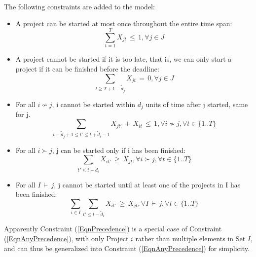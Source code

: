 \documentclass[final,3p,times]{elsarticle}
\begin{document}
	The following constraints are added to the model:
	
	\begin{itemize}
	
		\item A project can be started at most once throughout the entire time span:
		\begin{equation}
			\label{EqnConstraintStartOnlyOnce}
			\sum\limits_{t=1}^{T} X_{jt}\,\leq\,1,\forall j \in J
		\end{equation}
		
		\item A project cannot be started if it is too late, that is, we can only start a project if it can be finished before the deadline:
		\begin{equation}
			\sum\limits_{t\geq T+1-\tilde{d}_j} X_{jt}\,=\,0, \forall j \in J
		\end{equation}
		
		\item For all $i \nsim j$, i cannot be started within $d_j$ units of time after j started, same for j.
		\begin{equation}
			\sum\limits_{t-\tilde{d}_j+1\leq t'\leq t+\tilde{d}_i-1} X_{jt'}\,+\,X_{it}\,\leq\,1,\forall i \nsim j, \forall t \in \{1 .. T\}
		\end{equation}
		
		\item For all $i \succ j$, j can be started only if i has been finished:
		\begin{equation}
			\label{EqnPrecedence}
			\sum\limits_{t'\leq t-\tilde{d}_i} X_{it'} \,\geq\, X_{jt},\forall i\succ j, \forall t \in \{1 .. T\} 
		\end{equation}
		
		\item For all $I\,\vdash\,j$, j cannot be started until at least one of the projects in I has been finished:
		\begin{equation}
			\label{EqnAnyPrecedence}
			\sum\limits_{i\in I}\sum\limits_{t'\leq t-\tilde{d}_i} X_{it'}\,\geq\,X_{jt},\forall I\,\vdash\,j, \forall t \in \{1 .. T\}
		\end{equation}
	\end{itemize}

	Apparently Constraint (\ref{EqnPrecedence}) is a special case of Constraint (\ref{EqnAnyPrecedence}), with only Project $i$ rather than multiple elements in Set $I$, and can thus be generalized into Constraint (\ref{EqnAnyPrecedence}) for simplicity.
	
\end{document}
